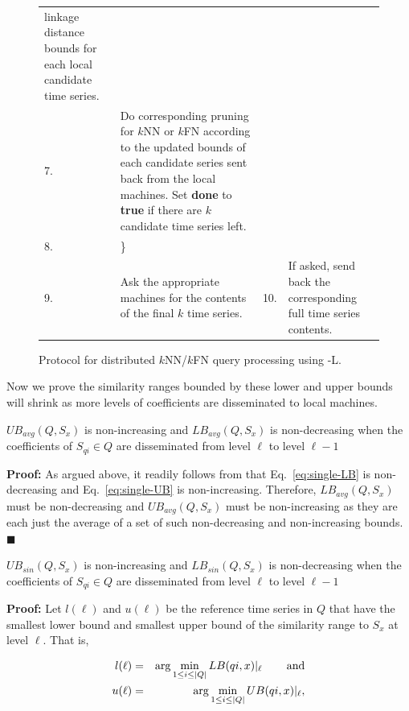 \begin{figure}[t!]
\begin{tabular}{|lp{3.2in}|lp{3.2in}|}
  linkage distance bounds for each local candidate time series. \\
7. & Do corresponding pruning for $k$NN or $k$FN according to the updated
  bounds of each candidate series sent back from the local machines.
  Set \textbf{done} to \textbf{true} if there are $k$
  candidate time series left. & & \\
8. & \} & & \\
9. & Ask the appropriate machines for the contents
of the final $k$ time series. &
10. & If asked, send back the corresponding full time series contents.\\ \hline
\end{tabular}
\vspace{-0.05in}
\caption{\label{fig:mswave-l}
Protocol for distributed $k$NN/$k$FN query processing using \MSWave-L{}.}
\end{figure}

Now we prove the similarity ranges bounded by these lower and upper
bounds will shrink as more levels of coefficients are disseminated to
local machines.

\begin{theorem} \label{theo:avg-bound-shrink}
$UB_{avg}(Q, S_x)$ is non-increasing and $LB_{avg}(Q, S_x)$ is
non-decreasing when the coefficients of $S_{qi} \in Q$ are
disseminated from level $\ell$ to level $\ell-1$
\end{theorem}

\textbf{Proof:} As argued above, it readily follows from
\cite{Yeh:2008:LLD} that Eq.~\eqref{eq:single-LB} is non-decreasing
and Eq.~\eqref{eq:single-UB} is non-increasing. Therefore,
$LB_{avg}(Q, S_x)$ must be non-decreasing and $UB_{avg}(Q, S_x)$ must
be non-increasing as they are each just the average of a set of such
non-decreasing and non-increasing bounds.  \hfill $\blacksquare$

\begin{theorem} \label{theo:sin-bound-shrink}
$UB_{sin}(Q, S_x)$ is non-increasing and $LB_{sin}(Q, S_x)$ is
non-decreasing when the coefficients of $S_{qi} \in Q$ are
disseminated from level $\ell$ to level $\ell-1$
\end{theorem}

\textbf{Proof:} Let $l(\ell)$ and $u(\ell)$ be the reference time
series in $Q$ that have the smallest lower bound and smallest upper
bound of the similarity range to $S_x$ at level $\ell$. That is,

{\small
\begin{eqnarray*}
l(\ell)& = & \arg\min_{1\leq i \leq |Q|}LB(qi,x)|_{\ell}
\hspace{0.3in} \textrm{and}\\
u(\ell)& = & \arg\min_{1\leq i \leq |Q|}UB(qi,x)|_{\ell},
\end{eqnarray*}
}

